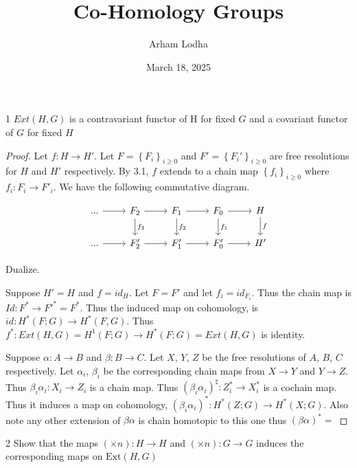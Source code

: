 \documentclass{article}
\newcommand{\Ext}[0]{\text{Ext}}
\begin{document}
\title{Co-Homology Groups}
\author{Arham Lodha}%
\date{March 18, 2025}%
\maketitle

\begin{PROB}{1}\label{Problem 1.}
    $Ext(H, G)$ is a contravariant functor of H for fixed $G$ and a covariant functor of $G$ for fixed $H$   
\end{PROB}
\begin{proof}
    Let $f: H \to H'$. Let $F = \left\{ F_i \right\}_{i \geq 0}$ and $F' = \left\{ F_i' \right\}_{i \geq 0}$ are free resolutions for $H$ and $H'$ respectively. By 3.1, $f$ extends to a chain map $\left\{ f_i \right\}_{i \geq 0}$ where $f_i: F_i \to F'_i$. We have the following commutative diagram. 
    
\[\begin{tikzcd}
	{...} & {F_2} & {F_1} & {F_0} & H \\
	{...} & {F_2'} & {F_1'} & {F_0'} & {H'}
	\arrow[from=1-1, to=1-2]
	\arrow[from=1-2, to=1-3]
	\arrow["{f_3}", from=1-2, to=2-2]
	\arrow[from=1-3, to=1-4]
	\arrow["{f_2}", from=1-3, to=2-3]
	\arrow[from=1-4, to=1-5]
	\arrow["{f_1}", from=1-4, to=2-4]
	\arrow["f", from=1-5, to=2-5]
	\arrow[from=2-1, to=2-2]
	\arrow[from=2-2, to=2-3]
	\arrow[from=2-3, to=2-4]
	\arrow[from=2-4, to=2-5]
\end{tikzcd}\]

    Dualize. 

    Suppose $H' = H$ and $f = id_H$. Let $F = F'$ and let $f_i = id_{F_i}$. Thus the chain map is $Id: F^* \to F'^* = F^*$. Thus the induced map on cohomology, is $id: H^*(F; G) \to H^*(F, G)$. Thus $f^*: Ext(H, G) = H^1(F; G) \to H^*(F; G) = Ext(H, G)$ is identity. 
    
    Suppose $\alpha: A \to B$ and $\beta: B \to C$. Let $X$, $Y$, $Z$ be the free resolutions of $A$, $B$, $C$ respectively. Let $\alpha_i$, $\beta_i$ be the corresponding chain maps from $X \to Y$ and $Y \to Z$. Thus $\beta_i \alpha_i: X_i \to Z_i$ is a chain map. Thus $(\beta_i \alpha_i)^\sharp: Z_i^* \to X_i^*$ is a cochain map. Thus it induces a map on cohomology, $(\beta_i \alpha_i)^*: H^*(Z; G) \to H^*(X; G)$. Also note any other extension of $\beta\alpha$ is chain homotopic to this one thus $(\beta \alpha)^* = $                  

\end{proof}

\bigskip

\begin{PROB}{2}\label{Problem 2.}
    Show that the maps $(\times n) : H \to H$ and $(\times n): G \to G$ induces the corresponding maps on $\Ext(H, G)$   
\end{PROB}
\end{document}
